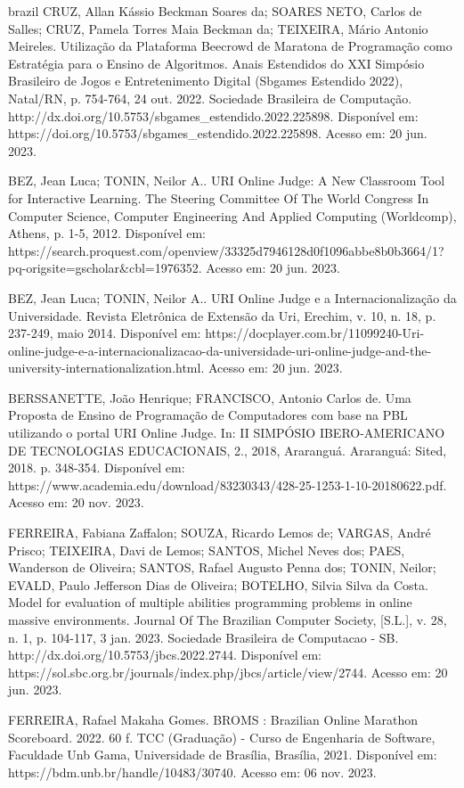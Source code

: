 \begin{otherlanguage*}{brazil}
CRUZ, Allan Kássio Beckman Soares da; SOARES NETO, Carlos de Salles; CRUZ, Pamela Torres Maia Beckman da; TEIXEIRA, Mário Antonio Meireles. Utilização da Plataforma Beecrowd de Maratona de Programação como Estratégia para o Ensino de Algoritmos. Anais Estendidos do XXI Simpósio Brasileiro de Jogos e Entretenimento Digital (Sbgames Estendido 2022), Natal/RN, p. 754-764, 24 out. 2022. Sociedade Brasileira de Computação. http://dx.doi.org/10.5753/sbgames_estendido.2022.225898. Disponível em: https://doi.org/10.5753/sbgames_estendido.2022.225898. Acesso em: 20 jun. 2023.

BEZ, Jean Luca; TONIN, Neilor A.. URI Online Judge: A New Classroom Tool for Interactive Learning. The Steering Committee Of The World Congress In Computer Science, Computer Engineering And Applied Computing (Worldcomp), Athens, p. 1-5, 2012. Disponível em: https://search.proquest.com/openview/33325d7946128d0f1096abbe8b0b3664/1?pq-origsite=gscholar&cbl=1976352. Acesso em: 20 jun. 2023.

BEZ, Jean Luca; TONIN, Neilor A.. URI Online Judge e a Internacionalização da Universidade. Revista Eletrônica de Extensão da Uri, Erechim, v. 10, n. 18, p. 237-249, maio 2014. Disponível em: https://docplayer.com.br/11099240-Uri-online-judge-e-a-internacionalizacao-da-universidade-uri-online-judge-and-the-university-internationalization.html. Acesso em: 20 jun. 2023.

BERSSANETTE, João Henrique; FRANCISCO, Antonio Carlos de. Uma Proposta de Ensino de Programação de Computadores com base na PBL utilizando o portal URI Online Judge. In: II SIMPÓSIO IBERO-AMERICANO DE TECNOLOGIAS EDUCACIONAIS, 2., 2018, Araranguá. Araranguá: Sited, 2018. p. 348-354. Disponível em: https://www.academia.edu/download/83230343/428-25-1253-1-10-20180622.pdf. Acesso em: 20 nov. 2023.

FERREIRA, Fabiana Zaffalon; SOUZA, Ricardo Lemos de; VARGAS, André Prisco; TEIXEIRA, Davi de Lemos; SANTOS, Michel Neves dos; PAES, Wanderson de Oliveira; SANTOS, Rafael Augusto Penna dos; TONIN, Neilor; EVALD, Paulo Jefferson Dias de Oliveira; BOTELHO, Silvia Silva da Costa. Model for evaluation of multiple abilities programming problems in online massive environments. Journal Of The Brazilian Computer Society, [S.L.], v. 28, n. 1, p. 104-117, 3 jan. 2023. Sociedade Brasileira de Computacao - SB. http://dx.doi.org/10.5753/jbcs.2022.2744. Disponível em: https://sol.sbc.org.br/journals/index.php/jbcs/article/view/2744. Acesso em: 20 jun. 2023.

FERREIRA, Rafael Makaha Gomes. BROMS : Brazilian Online Marathon Scoreboard. 2022. 60 f. TCC (Graduação) - Curso de Engenharia de Software, Faculdade Unb Gama, Universidade de Brasília, Brasília, 2021. Disponível em: https://bdm.unb.br/handle/10483/30740. Acesso em: 06 nov. 2023.


\end{otherlanguage*}
